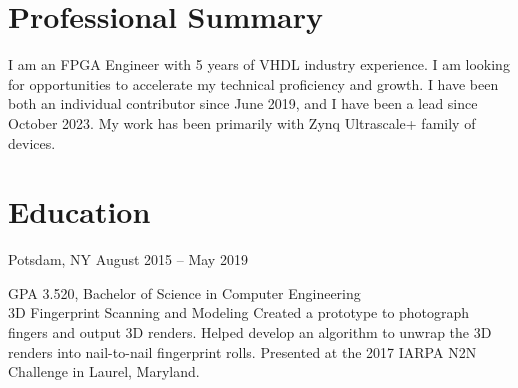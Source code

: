\documentclass[10pt,final,sans]{resume}
\begin{document}
\setlength\headheight{28pt} %

\section{Professional Summary}
\raggedright{I am an FPGA Engineer with 5 years of VHDL industry experience. I am looking for opportunities to accelerate my technical proficiency and growth. I have been both an individual contributor since June 2019, and I have been a lead since October 2023. My work has been primarily with Zynq Ultrascale+ family of devices.}

\section{Education}
 { Potsdam, NY } { August 2015 -- May 2019 }
\begin{adjustwidth}{.5cm}{}
  GPA 3.520, Bachelor of Science in Computer Engineering \\
   { 3D Fingerprint Scanning and Modeling } { }
  Created a prototype to photograph fingers and output 3D renders. Helped develop an algorithm to unwrap the 3D renders into nail-to-nail fingerprint rolls. Presented at the 2017 IARPA N2N Challenge in Laurel, Maryland. \\
\end{adjustwidth}
\end{document}
